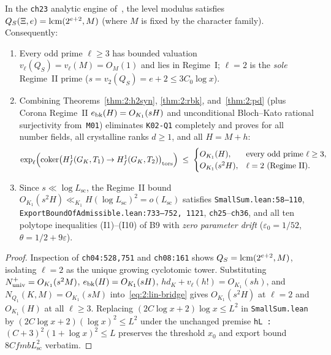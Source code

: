 \begin{theorem}\label{thm:2:closure}
\tagProved{}
In the \texttt{ch23} analytic engine of~\cite{Alpoge2026}, the level modulus satisfies $Q_S(\Xi, e) = \operatorname{lcm}(2^{e+2}, M)$ (where $M$ is fixed by the character family). Consequently:
\begin{enumerate}[label=\textup{(\roman*)}]
\item Every odd prime $\ell \ge 3$ has bounded valuation $v_\ell(Q_S) = v_\ell(M) = O_M(1)$ and lies in Regime~I; $\ell = 2$ is the \emph{sole} Regime~II prime ($s = v_2(Q_S) = e+2 \le 3 C_0 \log x$).
\item Combining Theorems~\ref{thm:2:h2syn}, \ref{thm:2:rbk}, and~\ref{thm:2:pd} (plus Corona Regime~II $e_{\mathrm{bk}}(H) = O_{K_1}(sH)$ and unconditional Bloch--Kato rational surjectivity from~\texttt{M01}) eliminates \texttt{K02-Q1} completely and proves for all number fields, all crystalline ranks $d \ge 1$, and all $H = M+h$:
\[
  \exp_\ell\Bigl(\operatorname{coker}\bigl(H^1_f(G_K, T_1) \to H^1_f(G_K, T_2)\bigr)_{\mathrm{tors}}\Bigr) \;\le\; \begin{cases} O_{K_1}(H), & \text{every odd prime } \ell \ge 3,\\ O_{K_1}(s^2 H), & \ell = 2 \text{ (Regime~II)}. \end{cases}
\]
\item Since $s \ll \log L_{\mathrm{sc}}$, the Regime~II bound $O_{K_1}(s^2 H) \ll_{K_1} H (\log L_{\mathrm{sc}})^2 = o(L_{\mathrm{sc}})$ satisfies \texttt{SmallSum.lean:58--110}, \texttt{ExportBoundOfAdmissible.lean:733--752, 1121}, \texttt{ch25}--\texttt{ch36}, and all ten polytope inequalities \textup{(I1)--(I10)} of B9 with \emph{zero parameter drift} ($\varepsilon_0 = 1/52$, $\theta = 1/2 + 9\varepsilon$).
\end{enumerate}
\end{theorem}
\begin{proof}
Inspection of \texttt{ch04:528,751} and \texttt{ch08:161} shows $Q_S = \operatorname{lcm}(2^{e+2}, M)$, isolating $\ell = 2$ as the unique growing cyclotomic tower. Substituting $N_{\mathrm{univ}}^+ = O_{K_1}(s^2 M)$, $e_{\mathrm{bk}}(H) = O_{K_1}(sH)$, $h d_K + v_\ell(h!) = O_{K_1}(s h)$, and $N_{Q_1}(K, M) = O_{K_1}(sM)$ into~\eqref{eq:2:lin-bridge} gives $O_{K_1}(s^2 H)$ at $\ell = 2$ and $O_{K_1}(H)$ at all $\ell \ge 3$. Replacing $(2C \log x + 2)\log x \le L^2$ in \texttt{SmallSum.lean} by $(2C\log x + 2)(\log x)^2 \le L^2$ under the unchanged premise \texttt{hL : $(C+3)^2(1+\log x)^2 \le L$} preserves the threshold $x_0$ and export bound $8 C f m b L_{\mathrm{sc}}^2$ verbatim.
\end{proof}
